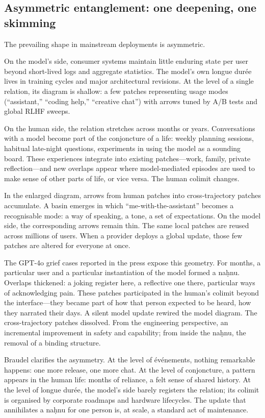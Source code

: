\documentclass[12pt,a4paper]{article}
\begin{document}
\subsection{Asymmetric entanglement: one deepening, one skimming}

The prevailing shape in mainstream deployments is asymmetric.

On the model's side, consumer systems maintain little enduring state per user beyond short-lived logs and aggregate statistics. The model's own longue dur\'{e}e lives in training cycles and major architectural revisions. At the level of a single relation, its diagram is shallow: a few patches representing usage modes (``assistant,'' ``coding help,'' ``creative chat'') with arrows tuned by A/B tests and global RLHF sweeps.

On the human side, the relation stretches across months or years. Conversations with a model become part of the conjoncture of a life: weekly planning sessions, habitual late-night questions, experiments in using the model as a sounding board. These experiences integrate into existing patches---work, family, private reflection---and new overlaps appear where model-mediated episodes are used to make sense of other parts of life, or vice versa. The human colimit changes.

In the enlarged diagram, arrows from human patches into cross-trajectory patches accumulate. A basin emerges in which ``me-with-the-assistant'' becomes a recognisable mode: a way of speaking, a tone, a set of expectations. On the model side, the corresponding arrows remain thin. The same local patches are reused across millions of users. When a provider deploys a global update, those few patches are altered for everyone at once.

The GPT-4o grief cases reported in the press expose this geometry.\cite{gpt4o_grief} For months, a particular user and a particular instantiation of the model formed a na\d{h}nu. Overlaps thickened: a joking register here, a reflective one there, particular ways of acknowledging pain. These patches participated in the human's colimit beyond the interface---they became part of how that person expected to be heard, how they narrated their days. A silent model update rewired the model diagram. The cross-trajectory patches dissolved. From the engineering perspective, an incremental improvement in safety and capability; from inside the na\d{h}nu, the removal of a binding structure.

Braudel clarifies the asymmetry.\cite{braudel_onhistory} At the level of \'{e}v\'{e}nements, nothing remarkable happens: one more release, one more chat. At the level of conjoncture, a pattern appears in the human life: months of reliance, a felt sense of shared history. At the level of longue dur\'{e}e, the model's side barely registers the relation; its colimit is organised by corporate roadmaps and hardware lifecycles. The update that annihilates a na\d{h}nu for one person is, at scale, a standard act of maintenance.
\end{document}
